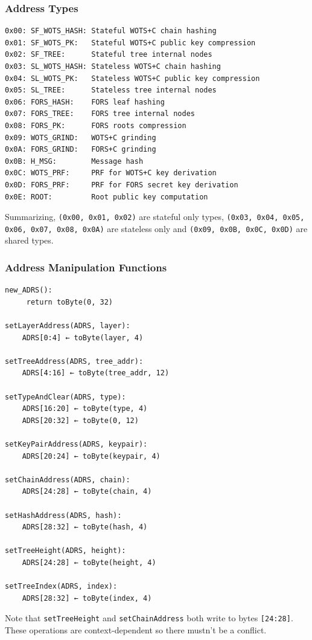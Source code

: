 \subsubsection{Address Types}
\begin{verbatim}
0x00: SF_WOTS_HASH: Stateful WOTS+C chain hashing
0x01: SF_WOTS_PK:   Stateful WOTS+C public key compression
0x02: SF_TREE:      Stateful tree internal nodes
0x03: SL_WOTS_HASH: Stateless WOTS+C chain hashing  
0x04: SL_WOTS_PK:   Stateless WOTS+C public key compression
0x05: SL_TREE:      Stateless tree internal nodes
0x06: FORS_HASH:    FORS leaf hashing
0x07: FORS_TREE:    FORS tree internal nodes
0x08: FORS_PK:      FORS roots compression
0x09: WOTS_GRIND:   WOTS+C grinding
0x0A: FORS_GRIND:   FORS+C grinding
0x0B: H_MSG:        Message hash
0x0C: WOTS_PRF:     PRF for WOTS+C key derivation
0x0D: FORS_PRF:     PRF for FORS secret key derivation
0x0E: ROOT:         Root public key computation
\end{verbatim}
Summarizing, \texttt{(0x00, 0x01, 0x02)} are stateful only types, \texttt{(0x03, 0x04, 0x05, 0x06, 0x07, 0x08, 0x0A)} are stateless only and \texttt{(0x09, 0x0B, 0x0C, 0x0D)} are shared types. 

\subsubsection{Address Manipulation Functions}
\begin{verbatim}
new_ADRS():
     return toByte(0, 32)

setLayerAddress(ADRS, layer):
    ADRS[0:4] ← toByte(layer, 4)

setTreeAddress(ADRS, tree_addr):
    ADRS[4:16] ← toByte(tree_addr, 12)

setTypeAndClear(ADRS, type):
    ADRS[16:20] ← toByte(type, 4)
    ADRS[20:32] ← toByte(0, 12)

setKeyPairAddress(ADRS, keypair):
    ADRS[20:24] ← toByte(keypair, 4)

setChainAddress(ADRS, chain):
    ADRS[24:28] ← toByte(chain, 4)

setHashAddress(ADRS, hash):
    ADRS[28:32] ← toByte(hash, 4)

setTreeHeight(ADRS, height):
    ADRS[24:28] ← toByte(height, 4)

setTreeIndex(ADRS, index):
    ADRS[28:32] ← toByte(index, 4)
\end{verbatim}

Note that \texttt{setTreeHeight} and \texttt{setChainAddress} both write to bytes \texttt{[24:28]}. These operations are context-dependent so there mustn't be a conflict.

